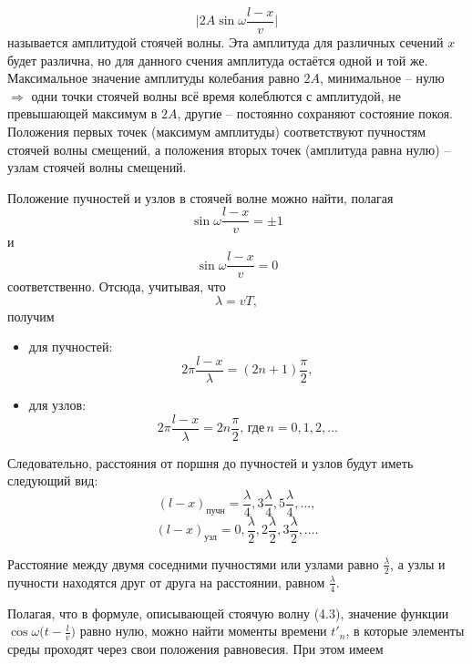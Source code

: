 \documentclass[referat,times]{SCWorks}
\begin{document}
\begin{equation}
    \bigg|2A \sin \omega \frac{l - x}{v}\bigg|
\end{equation}
называется амплитудой стоячей волны. Эта амплитуда для различных сечений $x$ будет различна, но для данного счения амплитуда остаётся одной и той же. Максимальное значение амплитуды колебания равно $2A$, минимальное -- нулю $\Rightarrow$ одни точки стоячей волны всё время колеблются с амплитудой, не превышающей максимум в $2A$, другие -- постоянно сохраняют состояние покоя. Положения первых точек (максимум амплитуды) соответствуют пучностям стоячей волны смещений, а положения вторых точек (амплитуда равна нулю) -- узлам стоячей волны смещений.
\par Положение пучностей и узлов в стоячей волне можно найти, полагая
\begin{equation*}
    \sin{\omega\frac{l - x}{v}} = \pm 1
\end{equation*}
и
\begin{equation*}
    \sin{\omega\frac{l - x}{v}} = 0
\end{equation*}
соответственно. Отсюда, учитывая, что
\begin{equation*}
    \lambda = vT,
\end{equation*}
получим
\begin{itemize}
    \item для пучностей:
\begin{equation}
    2\pi \frac{l - x}{\lambda} = (2n + 1) \frac \pi 2,
\end{equation}
    \item для узлов:
\begin{equation}
    2 \pi \frac{l - x}{\lambda} = 2n \frac \pi 2, \, \text{где} \, n = 0, 1, 2, \dots
\end{equation}
\end{itemize}
Следовательно, расстояния от поршня до пучностей и узлов будут иметь следующий вид:
\begin{equation}
    (l - x)_\text{пучн} = \frac \lambda 4, 3 \frac \lambda 4, 5 \frac \lambda 4, \dots,
\end{equation}
\begin{equation}
    (l - x)_\text{узл} = 0, \frac \lambda 2, 2 \frac \lambda 2, 3 \frac \lambda 2, \dots .
\end{equation}
\par Расстояние между двумя соседними пучностями или узлами равно $\frac \lambda 2$, а узлы и пучности находятся друг от друга на расстоянии, равном $\frac \lambda 4$.
\par Полагая, что в формуле, описывающей стоячую волну (4.3), значение функции $\cos{\omega\bigg(t - \frac l v\bigg)}$ равно нулю, можно найти моменты времени $t'_n$, в которые элементы среды проходят через свои положения равновесия. При этом имеем
\end{document}
